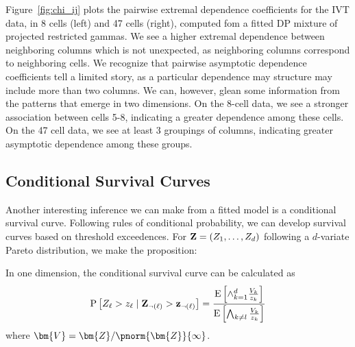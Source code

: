 Figure~\ref{fig:chi_ij} plots the pairwise extremal dependence coefficients for the IVT data, in 8
  cells (left) and 47 cells (right), computed fom a fitted DP mixture of projected restricted gammas.
  We see a higher extremal dependence between neighboring columns which is not unexpected, as
  neighboring columns correspond to neighboring cells.  We recognize that pairwise asymptotic
  dependence coefficients tell a limited story, as a particular dependence may structure may include
  more than two columns.   We can, however, glean some information from the patterns that emerge in
  two dimensions.  On the 8-cell data, we see a stronger association between cells 5-8, indicating a
  greater dependence among these cells.  On the 47 cell data, we see at least 3 groupings of columns,
  indicating greater asymptotic dependence among these groups.

\subsection{Conditional Survival Curves}
Another interesting inference we can make from a fitted model is a conditional survival curve.
  Following rules of conditional probability, we can develop survival curves based on
  threshold exceedences. For ${\bf Z} = (Z_1,\ldots,Z_d)$ following a $d$-variate Pareto
  distribution, we make the proposition:

\begin{prop}
    In one dimension, the conditional survival curve can be calculated as
 \begin{equation}
    \label{eqn:condsurv1df}
    \text{P}\left[Z_{\ell} > z_{\ell}\mid {\bf Z}_{\neg(\ell)} > {\bf z}_{\neg(\ell)}\right] =
      \frac{\text{E}\left[\wedge_{k = 1}^d \frac{V_k}{z_k}\right]}{\text{E}\left[\bigwedge_{k \neq l}\frac{V_k}{z_k}\right]}
  \end{equation}
    where $\bm{V} = \bm{Z} / \pnorm{\bm{Z}}{\infty}$.
\end{prop}

